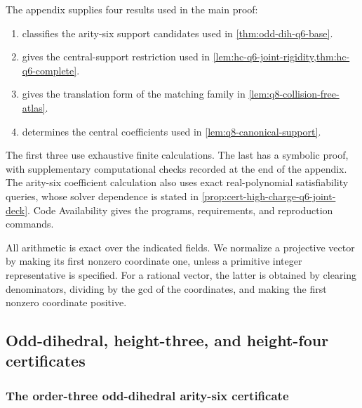 \documentclass[11pt,letterpaper,onecolumn]{article}
\theoremstyle{plain}
\theoremstyle{definition}
\theoremstyle{remark}
\begin{document}
The appendix supplies four results used in the main proof:
\begin{enumerate}
\item {} classifies the arity-six
support candidates used in \cref{thm:odd-dih-q6-base}.
\item {} gives the central-support
restriction used in \cref{lem:hc-q6-joint-rigidity,thm:hc-q6-complete}.
\item {} gives the translation
form of the matching family in \cref{lem:q8-collision-free-atlas}.
\item {} determines the central
coefficients used in \cref{lem:q8-canonical-support}.
\end{enumerate}
The first three use exhaustive finite calculations. The last has a
symbolic proof, with supplementary computational checks recorded at the
end of the appendix. The arity-six coefficient calculation also uses exact
real-polynomial satisfiability queries, whose solver dependence is stated
in \cref{prop:cert-high-charge-q6-joint-deck}. Code Availability gives
the programs, requirements, and reproduction commands.
	
All arithmetic is exact over the indicated fields. We normalize a
projective vector by making its first nonzero coordinate one, unless a
primitive integer representative is specified. For a rational vector,
the latter is obtained by clearing denominators, dividing by the gcd of
the coordinates, and making the first nonzero coordinate positive.
	
	
	
	\subsection{Odd-dihedral, height-three, and height-four certificates}
	\label{proofsec:finite-certificates}
	
	\subsubsection{The order-three odd-dihedral arity-six certificate}
	\label{proofsubsec:cert-odd-dih-q6}
	
\end{document}
